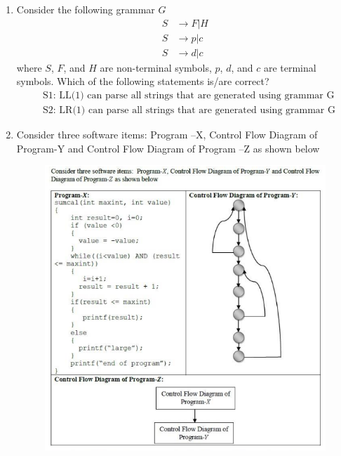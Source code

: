 \documentclass[journal,12pt,onecolumn]{IEEEtran}
\theoremstyle{remark}
\begin{document}
\begin{enumerate}
				\item Consider the following grammar $G$
				\begin{align*}
					S &\rightarrow F | H\\
					S &\rightarrow p | c\\
					S &\rightarrow d | c
				\end{align*}
				where $S$, $F$, and $H$ are non-terminal symbols, $p$, $d$, and $c$ are terminal symbols. Which of the following statements is/are correct?
				\begin{align*}
					&\text{S1: LL(1) can parse all strings that are generated using grammar G}\\
					&\text{S2: LR(1) can parse all strings that are generated using grammar G}
				\end{align*}
				
				\hfill{}
				
				\begin{enumerate}
				\end{enumerate}
				
				\item Consider three software items: Program –X, Control Flow Diagram of Program-Y and Control Flow Diagram of Program –Z as shown below
				
				\begin{figure}[H]
					\centering
					\includegraphics[width=0.7\linewidth]{figs/screenshot001}
				\end{figure}
				

\end{enumerate}
\end{document}
